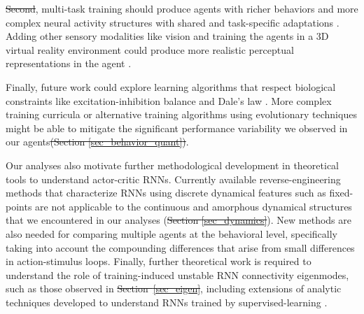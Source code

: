 \documentclass[5p,twocolumn,authoryear]{elsarticle}
\providecommand{\DIFaddtex}[1]{{\protect\color{blue}\uwave{#1}}} %
\providecommand{\DIFdeltex}[1]{{\protect\color{red}\sout{#1}}}                      %
\providecommand{\DIFaddbegin}{} %
\providecommand{\DIFaddend}{} %
\providecommand{\DIFdelbegin}{} %
\providecommand{\DIFdelend}{} %
\providecommand{\DIFadd}[1]{\texorpdfstring{\DIFaddtex{#1}}{#1}} %
\providecommand{\DIFdel}[1]{\texorpdfstring{\DIFdeltex{#1}}{}} %
\newcommand{\DIFscaledelfig}{0.5}
\newlength{\DIFdelgraphicswidth} %
\newlength{\DIFdelgraphicsheight} %
\newcommand{\DIFaddincludegraphics}[2][]{{\color{blue}\fbox{\DIFOincludegraphics[#1]{#2}}}} %
\newcommand{\DIFdelincludegraphics}[2][]{%
\sbox{\DIFdelgraphicsbox}{\DIFOincludegraphics[#1]{#2}}%
\settoboxwidth{\DIFdelgraphicswidth}{\DIFdelgraphicsbox} %
\settoboxtotalheight{\DIFdelgraphicsheight}{\DIFdelgraphicsbox} %
\scalebox{\DIFscaledelfig}{%
\parbox[b]{\DIFdelgraphicswidth}{\usebox{\DIFdelgraphicsbox}\\[-\baselineskip] \rule{\DIFdelgraphicswidth}{0em}}\llap{\resizebox{\DIFdelgraphicswidth}{\DIFdelgraphicsheight}{%
\setlength{\unitlength}{\DIFdelgraphicswidth}%
\begin{picture}(1,1)%
\thicklines\linethickness{2pt} %
{\color[rgb]{1,0,0}\put(0,0){\framebox(1,1){}}}%
{\color[rgb]{1,0,0}\put(0,0){\line( 1,1){1}}}%
{\color[rgb]{1,0,0}\put(0,1){\line(1,-1){1}}}%
\end{picture}%
}\hspace*{3pt}}} %
} %
\DeclareRobustCommand{\DIFaddbegin}{\DIFOaddbegin \let\includegraphics\DIFaddincludegraphics} %
\DeclareRobustCommand{\DIFaddend}{\DIFOaddend \let\includegraphics\DIFOincludegraphics} %
\DeclareRobustCommand{\DIFdelbegin}{\DIFOdelbegin \let\includegraphics\DIFdelincludegraphics} %
\DeclareRobustCommand{\DIFdelend}{\DIFOaddend \let\includegraphics\DIFOincludegraphics} %
\begin{document}
\DIFdelbegin \DIFdel{Second}\DIFdelend \DIFaddbegin \DIFadd{Third}\DIFaddend , multi-task training should produce agents with richer behaviors and more complex neural activity structures with shared and
task-specific adaptations \citep{crawshaw2020multi,yang2019task,duncker2020organizing,mlynarski2018adaptive,weber2019role}.
Adding other sensory modalities like vision and training the agents in a 3D virtual reality environment could produce more realistic perceptual representations in the agent \citep{crosby2019animal, crosby2020building}.

Finally, future work could explore learning algorithms that respect biological constraints like excitation-inhibition balance and Dale's law \citep{GOULAS2021,ehrlich2021psychrnn,delahunt2018biological}.
More complex training curricula \citep{bengio2009curriculum} or
alternative training algorithms using evolutionary techniques \citep{de2013evolutionary,stanley2019designing,gupta2021embodied} might be able to mitigate the significant performance variability we observed in our agents\DIFdelbegin \DIFdel{(Section \ref{sec_behavior_quant})}\DIFdelend .


Our analyses also motivate further methodological development in theoretical tools to understand actor-critic RNNs.
Currently available reverse-engineering methods that characterize RNNs using discrete dynamical features such as fixed-points  \citep{sussillo2013opening,maheswaranathan2019universality,maheswaranathan2019reverse} are not applicable to the continuous and amorphous dynamical structures that we encountered in our analyses (\DIFdelbegin \DIFdel{Section \ref{sec_dynamics}}\DIFdelend \DIFaddbegin \DIFadd{Figure \ref{fig_dynamics}}\DIFaddend ).
New methods are also needed for comparing multiple agents at the behavioral level, specifically taking into account the compounding differences that arise from small differences in action-stimulus loops.
Finally, further theoretical work is required to understand the role of training-induced unstable RNN connectivity eigenmodes, such as those observed in \DIFdelbegin \DIFdel{Section~\ref{sec_eigen}}\DIFdelend \DIFaddbegin \DIFadd{Figure~\ref{fig_eigen_mlps}}\DIFaddend , including extensions of analytic techniques developed to understand RNNs trained by supervised-learning \citep{sussillo2009generating,rajan2006eigenvalue,maheswaranathan2019reverse,mikulik2020meta,schaeffer2020reverse}.
\DIFaddbegin \\
\DIFaddend 
\end{document}
